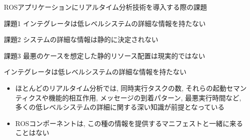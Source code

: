 
\begin{frame}{ROSアプリケーションにリアルタイム分析技術を導入する際の課題}
    \begin{block}{課題1}
        インテグレータは低レベルシステムの詳細な情報を持たない
    \end{block}
    \begin{block}{課題2}
        システムの詳細な情報は静的に決定されない
    \end{block}
    \begin{block}{課題3}
        最悪のケースを想定した静的リソース配置は現実的ではない
    \end{block}
\end{frame}

\begin{frame}{インテグレータは低レベルシステムの詳細な情報を持たない}
    \begin{itemize}
        \item ほとんどのリアルタイム分析では, 同時実行タスクの数, それらの起動セマンティクスや機能的相互作用, メッセージの到着パターン, 最悪実行時間など, 多くの低レベルシステムの詳細に関する深い知識が前提となっている
        \item ROSコンポーネントは, この種の情報を提供するマニフェストと一緒に来ることはない
    \end{itemize}
\end{frame}

